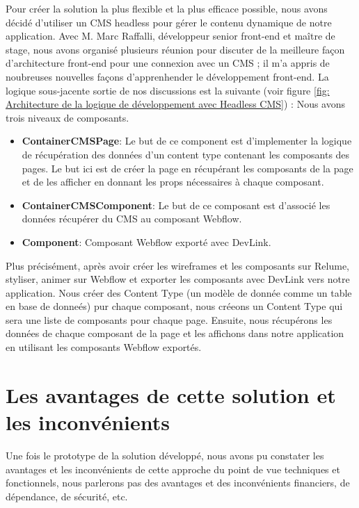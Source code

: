 Pour créer la solution la plus flexible et la plus efficace possible, nous avons décidé d'utiliser un CMS headless pour gérer le contenu dynamique de notre application. Avec M. Marc Raffalli, développeur senior front-end et maître de stage, nous avons organisé plusieurs réunion pour discuter de la meilleure façon d'architecture front-end pour une connexion avec un CMS ; il m'a appris de noubreuses nouvelles façons d'apprenhender le développement front-end. La logique sous-jacente sortie de nos discussions est la suivante (voir figure \ref{fig: Architecture de la logique de développement avec Headless CMS}) :
Nous avons trois niveaux de composants.
\begin{itemize}
  \item \textbf{ContainerCMSPage}: Le but de ce component est d'implementer la logique de récupération des données d'un content type contenant les composants des pages. Le but ici est de créer la page en récupérant les composants de la page et de les afficher en donnant les props nécessaires à chaque composant.
  \item \textbf{ContainerCMSComponent}: Le but de ce composant est d'associé les données récupérer du CMS au composant Webflow.
  \item \textbf{Component}: Composant Webflow exporté avec DevLink.
\end{itemize}
\vspace{0.8cm}
Plus précisément, après avoir créer les wireframes et les composants sur Relume, styliser, animer sur Webflow et exporter les composants avec DevLink vers notre application. Nous créer des Content Type (un modèle de donnée comme un table en base de donneés) pur chaque composant, nous créeons un Content Type qui sera une liste de composants pour chaque page. Ensuite, nous récupérons les données de chaque composant de la page et les affichons dans notre application en utilisant les composants Webflow exportés.

\section{Les avantages de cette solution et les inconvénients}

Une fois le prototype de la solution développé, nous avons pu constater les avantages et les inconvénients de cette approche du point de vue techniques et fonctionnels, nous parlerons pas des avantages et des inconvénients financiers, de dépendance, de sécurité, etc.

